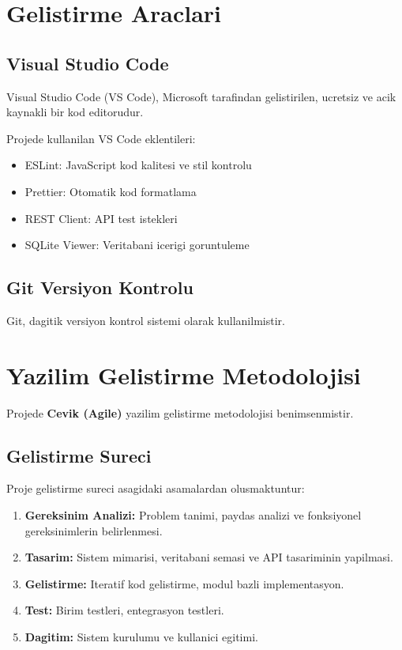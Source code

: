 \section{Gelistirme Araclari}
\label{sec:gelistirme-araclari}

\subsection{Visual Studio Code}
\label{subsec:vscode}

Visual Studio Code (VS Code), Microsoft tarafindan gelistirilen, 
ucretsiz ve acik kaynakli bir kod editorudur.

Projede kullanilan VS Code eklentileri:
\begin{itemize}
    \item ESLint: JavaScript kod kalitesi ve stil kontrolu
    \item Prettier: Otomatik kod formatlama
    \item REST Client: API test istekleri
    \item SQLite Viewer: Veritabani icerigi goruntuleme
\end{itemize}

\subsection{Git Versiyon Kontrolu}
\label{subsec:git}

Git, dagitik versiyon kontrol sistemi olarak kullanilmistir.

\section{Yazilim Gelistirme Metodolojisi}
\label{sec:metodoloji}

Projede \textbf{Cevik (Agile)} yazilim gelistirme metodolojisi 
benimsenmistir.

\subsection{Gelistirme Sureci}
\label{subsec:gelistirme-sureci}

Proje gelistirme sureci asagidaki asamalardan olusmaktuntur:

\begin{enumerate}
    \item \textbf{Gereksinim Analizi:} Problem tanimi, paydas 
    analizi ve fonksiyonel gereksinimlerin belirlenmesi.
    \item \textbf{Tasarim:} Sistem mimarisi, veritabani semasi 
    ve API tasariminin yapilmasi.
    \item \textbf{Gelistirme:} Iteratif kod gelistirme, modul 
    bazli implementasyon.
    \item \textbf{Test:} Birim testleri, entegrasyon testleri.
    \item \textbf{Dagitim:} Sistem kurulumu ve kullanici egitimi.
\end{enumerate}

